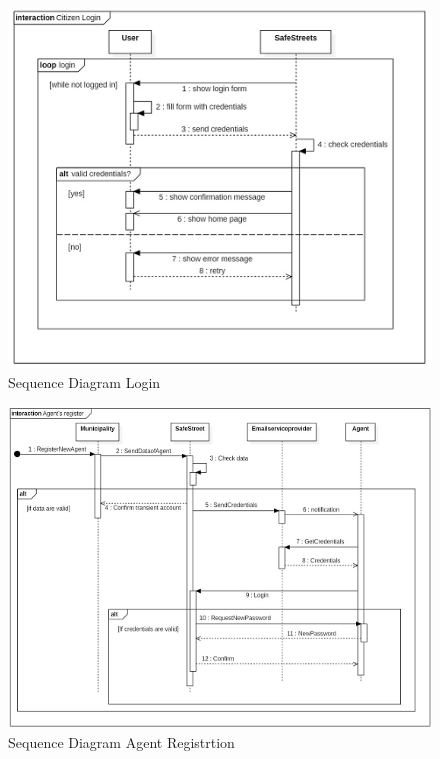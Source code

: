 \begin{figure}[h]
\centering
\includegraphics{Images/sequence_login.png}
\caption{\label{fig:SDL}Sequence Diagram Login}
\end{figure}
\begin{figure}[h]
\centering
\includegraphics{Images/sequence_agent_register.png}
\caption{\label{fig:SDAR}Sequence Diagram Agent Registrtion} 
\end{figure}

